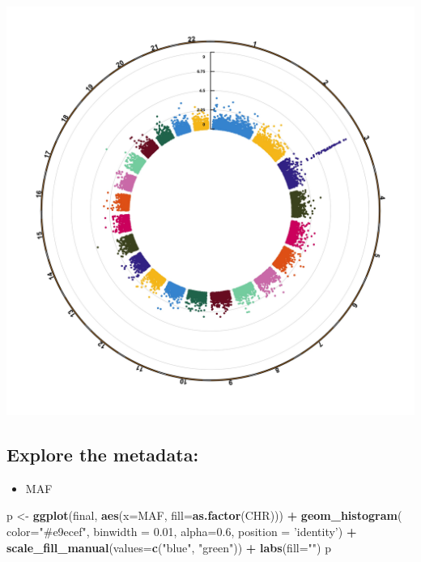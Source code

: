\documentclass[
]{article}
\newenvironment{Shaded}{\begin{snugshade}}{\end{snugshade}}
\newcommand{\DataTypeTok}[1]{\textcolor[rgb]{0.13,0.29,0.53}{#1}}
\newcommand{\FloatTok}[1]{\textcolor[rgb]{0.00,0.00,0.81}{#1}}
\newcommand{\KeywordTok}[1]{\textcolor[rgb]{0.13,0.29,0.53}{\textbf{#1}}}
\newcommand{\NormalTok}[1]{#1}
\newcommand{\OperatorTok}[1]{\textcolor[rgb]{0.81,0.36,0.00}{\textbf{#1}}}
\newcommand{\StringTok}[1]{\textcolor[rgb]{0.31,0.60,0.02}{#1}}
\providecommand{\tightlist}{%
  \setlength{\itemsep}{0pt}\setlength{\parskip}{0pt}}
\begin{document}
\includegraphics{../Circular-Manhattan.P.jpg}

\hypertarget{explore-the-metadata}{%
\subsection{Explore the metadata:}\label{explore-the-metadata}}

\begin{itemize}
\tightlist
\item
  MAF
\end{itemize}

\begin{Shaded}
\begin{Highlighting}[]
\NormalTok{p <-}\StringTok{ }\KeywordTok{ggplot}\NormalTok{(final, }\KeywordTok{aes}\NormalTok{(}\DataTypeTok{x=}\NormalTok{MAF, }\DataTypeTok{fill=}\KeywordTok{as.factor}\NormalTok{(CHR))) }\OperatorTok{+}\StringTok{ }\KeywordTok{geom_histogram}\NormalTok{( }\DataTypeTok{color=}\StringTok{"#e9ecef"}\NormalTok{, }\DataTypeTok{binwidth =} \FloatTok{0.01}\NormalTok{, }\DataTypeTok{alpha=}\FloatTok{0.6}\NormalTok{, }\DataTypeTok{position =} \StringTok{'identity'}\NormalTok{) }\OperatorTok{+}
\StringTok{    }\KeywordTok{scale_fill_manual}\NormalTok{(}\DataTypeTok{values=}\KeywordTok{c}\NormalTok{(}\StringTok{"blue"}\NormalTok{, }\StringTok{"green"}\NormalTok{)) }\OperatorTok{+}
\StringTok{    }\KeywordTok{labs}\NormalTok{(}\DataTypeTok{fill=}\StringTok{""}\NormalTok{)}
\NormalTok{p}
\end{Highlighting}
\end{Shaded}
\end{document}
